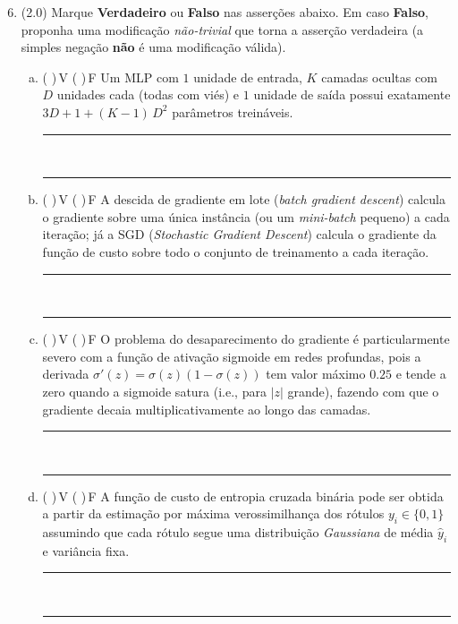 \documentclass[11pt,a4paper]{article}
\begin{document}
\begin{enumerate}[1)]
\setcounter{enumi}{5}

\item (2.0) Marque \textbf{Verdadeiro} ou \textbf{Falso} nas asserções abaixo. Em caso \textbf{Falso}, proponha uma modificação \emph{não-trivial} que torna a asserção verdadeira (a simples negação \textbf{não} é uma modificação válida).

\begin{enumerate}[a)]
    \item ( )\,V \quad ( )\,F \quad Um MLP com $1$ unidade de entrada, $K$ camadas ocultas com $D$ unidades cada (todas com viés) e $1$ unidade de saída possui exatamente $3D + 1 + (K - 1)\,D^2$ parâmetros treináveis.\\[0.2em]
    \rule{\linewidth}{0.4pt}\\[0.2em]
    \rule{\linewidth}{0.4pt}

    \item ( )\,V \quad ( )\,F \quad A descida de gradiente em lote (\textit{batch gradient descent}) calcula o gradiente sobre uma única instância (ou um \textit{mini-batch} pequeno) a cada iteração; já a SGD (\textit{Stochastic Gradient Descent}) calcula o gradiente da função de custo sobre todo o conjunto de treinamento a cada iteração.\\[0.2em]
    \rule{\linewidth}{0.4pt}\\[0.2em]
    \rule{\linewidth}{0.4pt}

    \item ( )\,V \quad ( )\,F \quad O problema do desaparecimento do gradiente é particularmente severo com a função de ativação sigmoide em redes profundas, pois a derivada $\sigma'(z) = \sigma(z)(1-\sigma(z))$ tem valor máximo $0.25$ e tende a zero quando a sigmoide satura (i.e., para $|z|$ grande), fazendo com que o gradiente decaia multiplicativamente ao longo das camadas.\\[0.2em]
    \rule{\linewidth}{0.4pt}\\[0.2em]
    \rule{\linewidth}{0.4pt}

    \item ( )\,V \quad ( )\,F \quad A função de custo de entropia cruzada binária pode ser obtida a partir da estimação por máxima verossimilhança dos rótulos $y_i \in \{0, 1\}$ assumindo que cada rótulo segue uma distribuição \emph{Gaussiana} de média $\hat{y}_i$ e variância fixa.\\[0.2em]
    \rule{\linewidth}{0.4pt}\\[0.2em]
    \rule{\linewidth}{0.4pt}


\end{enumerate}
\end{enumerate}
\end{document}
